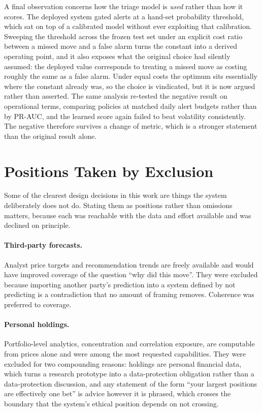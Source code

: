 A final observation concerns how the triage model is \emph{used} rather than how it scores. The
deployed system gated alerts at a hand-set probability threshold, which sat on top of a calibrated
model without ever exploiting that calibration. Sweeping the threshold across the frozen test set
under an explicit cost ratio between a missed move and a false alarm turns the constant into a
derived operating point, and it also exposes what the original choice had silently assumed: the
deployed value corresponds to treating a missed move as costing roughly the same as a false alarm.
Under equal costs the optimum sits essentially where the constant already was, so the choice is
vindicated, but it is now argued rather than asserted. The same analysis re-tested the negative
result on operational terms, comparing policies at matched daily alert budgets rather than by
PR-AUC, and the learned score again failed to beat volatility consistently. The negative therefore
survives a change of metric, which is a stronger statement than the original result alone.

\section{Positions Taken by Exclusion}
\label{sec:concl_exclusions}

Some of the clearest design decisions in this work are things the system deliberately does not do.
Stating them as positions rather than omissions matters, because each was reachable with the data
and effort available and was declined on principle.

\paragraph{Third-party forecasts.} Analyst price targets and recommendation trends are freely
available and would have improved coverage of the question ``why did this move''. They were excluded
because importing another party's prediction into a system defined by not predicting is a
contradiction that no amount of framing removes. Coherence was preferred to coverage.

\paragraph{Personal holdings.} Portfolio-level analytics, concentration and correlation exposure,
are computable from prices alone and were among the most requested capabilities. They were excluded
for two compounding reasons: holdings are personal financial data, which turns a research prototype
into a data-protection obligation rather than a data-protection discussion, and any statement of the
form ``your largest positions are effectively one bet'' is advice however it is phrased, which
crosses the boundary that the system's ethical position depends on not crossing.

